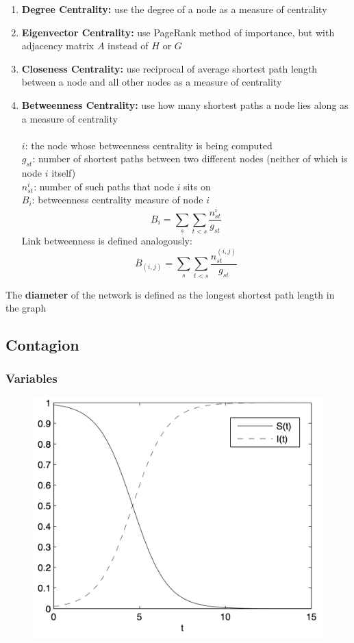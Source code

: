 \documentclass{article}
\newcommand{\MatrixVariable}[1]{\bm{\mathit{#1}}}
\begin{document}
\begin{enumerate}
\item \textbf{Degree Centrality:} use the degree of a node as a measure of centrality
\item \textbf{Eigenvector Centrality:} use PageRank method of importance, but with adjacency matrix $\MatrixVariable{A}$ instead of $\MatrixVariable{H}$ or $\MatrixVariable{G}$
\item \textbf{Closeness Centrality:} use reciprocal of average shortest path length between a node and all other nodes as a measure of centrality
\item \textbf{Betweenness Centrality:} use how many shortest paths a node lies along as a measure of centrality \\
\\
$i$: the node whose betweenness centrality is being computed \\
$g_{st}$: number of shortest paths between two different nodes (neither of which is node $i$ itself) \\
$n^i_{st}$: number of such paths that node $i$ sits on \\
$B_i$: betweenness centrality measure of node $i$
$$B_i = \sum_s \sum_{t<s} \frac{n^i_{st}}{g_{st}}$$
Link betweenness is defined analogously:
$$B_{(i,j)} = \sum_s \sum_{t<s} \frac{n^{(i,j)}_{st}}{g_{st}}$$
\end{enumerate}
The \textbf{diameter} of the network is defined as the longest shortest path length in the graph

\subsection{Contagion}

\subsubsection{Variables}

\begin{figure}
\includegraphics[width=\linewidth]{SI.png}
\end{figure}
\end{document}
